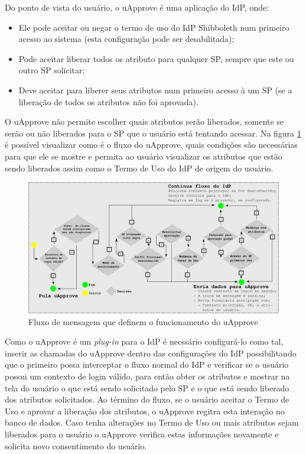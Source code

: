 Do ponto de vista do usuário, o uApprove é uma aplicação do IdP, onde:
\begin{itemize}
	\item Ele pode aceitar ou negar o termo de uso do IdP Shibboleth num primeiro acesso ao sistema (esta configuração pode ser desabilitada);
	\item Pode aceitar liberar todos os atributo para qualquer SP, sempre que este ou outro SP solicitar;
	\item Deve aceitar para liberer seus atributos num primeiro acesso à um SP (se a liberação de todos os atributos não foi aprovada).
\end{itemize}

O uApprove não permite escolher quais atributos serão liberados, somente se serão ou não liberados para o SP que o usuário está tentando acessar. Na figura \ref{fig_13} é possível visualizar como é o fluxo do uApprove, quais condições são necessárias para que ele se mostre e permita ao usuário visualizar os atributos que estão sendo liberados assim como o Termo de Uso do IdP de origem do usuário.

\begin{figure}[!ht]
 \centering
 \includegraphics[width=1\textwidth]{figuras/fluxo-uapprove.png}
 \caption{Fluxo de mensagem que definem o funcionamento do uApprove}
 \label{fig_13}
\end{figure}

Como o uApprove é um \textit{plug-in} para o IdP é necssário configurá-lo como tal, inserir as chamadas do uApprove dentro das configurações do IdP possibilitando que o primeiro possa interceptar o fluxo normal do IdP e verificar se o usuário possui um contexto de login válido, para então obter os atributos e mostrar na tela do usuário o que está sendo solicitado pelo SP e o que está sendo liberado dos atributos solicitados. Ao término do fluxo, se o usuário aceitar o Termo de Uso e aprovar a liberação dos atributos, o uApprove regitra esta interação no banco de dados. Caso tenha alterações no Termo de Uso ou mais atributos sejam liberados para o usuário o uApprove verifica estas informações novamente e solicita novo consentimento do usuário.

